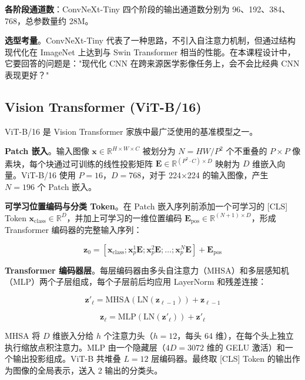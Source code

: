 \documentclass[12pt,a4paper,UTF8,openany]{ctexbook}
\begin{document}
\textbf{各阶段通道数}：ConvNeXt-Tiny 四个阶段的输出通道数分别为 96、192、384、768，总参数量约 28M。

\textbf{选型考量}。ConvNeXt-Tiny 代表了一种思路，不引入自注意力机制，但通过结构现代化在 ImageNet 上达到与 Swin Transformer 相当的性能。在本课程设计中，它要回答的问题是："现代化 CNN 在跨来源医学影像任务上，会不会比经典 CNN 表现更好？"

\subsection{Vision Transformer (ViT-B/16)}

ViT-B/16 是 Vision Transformer 家族中最广泛使用的基准模型之一\cite{dosovitskiy2021}。

\textbf{Patch 嵌入}。输入图像 $\mathbf{x} \in \mathbb{R}^{H \times W \times C}$ 被划分为 $N = HW/P^2$ 个不重叠的 $P \times P$ 像素块，每个块通过可训练的线性投影矩阵 $\mathbf{E} \in \mathbb{R}^{(P^2 \cdot C) \times D}$ 映射为 $D$ 维嵌入向量。ViT-B/16 使用 $P=16$，$D=768$，对于 224×224 的输入图像，产生 $N=196$ 个 Patch 嵌入。

\textbf{可学习位置编码与分类 Token}。在 Patch 嵌入序列前添加一个可学习的 [CLS] Token $\mathbf{x}_{\text{class}} \in \mathbb{R}^D$，并加上可学习的一维位置编码 $\mathbf{E}_{\text{pos}} \in \mathbb{R}^{(N+1) \times D}$，形成 Transformer 编码器的完整输入序列：

\begin{equation}
\mathbf{z}_0 = [\mathbf{x}_{\text{class}}; \mathbf{x}_p^1\mathbf{E}; \mathbf{x}_p^2\mathbf{E}; \ldots; \mathbf{x}_p^N\mathbf{E}] + \mathbf{E}_{\text{pos}}
\end{equation}

\textbf{Transformer 编码器层}。每层编码器由多头自注意力（MHSA）和多层感知机（MLP）两个子层组成，每个子层前后均应用 LayerNorm 和残差连接：

\begin{equation}
\mathbf{z}'_{\ell} = \text{MHSA}\left(\text{LN}\left(\mathbf{z}_{\ell-1}\right)\right) + \mathbf{z}_{\ell-1}
\end{equation}

\begin{equation}
\mathbf{z}_{\ell} = \text{MLP}\left(\text{LN}\left(\mathbf{z}'_{\ell}\right)\right) + \mathbf{z}'_{\ell}
\end{equation}

MHSA 将 $D$ 维嵌入分给 $h$ 个注意力头（$h=12$，每头 64 维），在每个头上独立执行缩放点积注意力。MLP 由一个隐藏层（$4D=3072$ 维的 GELU 激活）和一个输出投影组成。ViT-B 共堆叠 $L=12$ 层编码器。最终取 [CLS] Token 的输出作为图像的全局表示，送入 2 输出的分类头。
\end{document}
